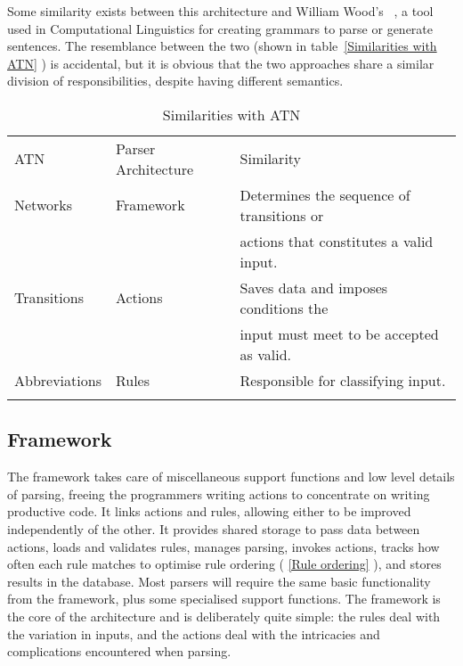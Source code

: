 \documentclass{svmult}
\newcommand{\tabletopline}[0]{%
    \hline%
    \noalign{\smallskip}%
}
\newcommand{\tablebottomline}[0]{%
    \noalign{\smallskip}%
    \hline%
}
\newcommand{\tablemiddleline}[0]{%
    \noalign{\smallskip}%
    \hline%
    \noalign{\smallskip}%
}
\newcommand{\sectionref}[1]{%
    \textsection{}\vref*{#1}%
}
\newcommand{\refwithlabel}[2]{%
    #1~\vref{#2}%
}
\newcommand{\tableref}[1]{%
    \refwithlabel{table}{#1}%
}
\begin{document}
Some similarity exists between this architecture and William Wood's
\ATN{}~\cite{atns, nlpip}, a tool used in Computational Linguistics for
creating grammars to parse or generate sentences.  The resemblance between
the two (shown in \tableref{Similarities with ATN}) is accidental, but it
is obvious that the two approaches share a similar division of
responsibilities, despite having different semantics.


\begin{table}[hbtp]
    \caption{Similarities with ATN}\label{Similarities with ATN}
    \begin{tabular}[]{lll}
        \tabletopline{}%
        ATN           & Parser Architecture & Similarity                                \\
        \tablemiddleline{}%
        Networks      & Framework           & Determines the sequence of transitions or \\
                      &                     & actions that constitutes a valid input.   \\
        Transitions   & Actions             & Saves data and imposes conditions the     \\
                      &                     & input must meet to be accepted as valid.  \\
        Abbreviations & Rules               & Responsible for classifying input.        \\
        \tablebottomline{}%
    \end{tabular}
\end{table}

\subsection{Framework}

\label{Framework}

The framework takes care of miscellaneous support functions and low level
details of parsing, freeing the programmers writing actions to concentrate
on writing productive code.  It links actions and rules, allowing either to
be improved independently of the other.  It provides shared storage to pass
data between actions, loads and validates rules, manages parsing, invokes
actions, tracks how often each rule matches to optimise rule ordering
(\sectionref{Rule ordering}), and stores results in the database.  Most
parsers will require the same basic functionality from the framework, plus
some specialised support functions.  The framework is the core of the
architecture and is deliberately quite simple: the rules deal with the
variation in inputs, and the actions deal with the intricacies and
complications encountered when parsing.
\end{document}
